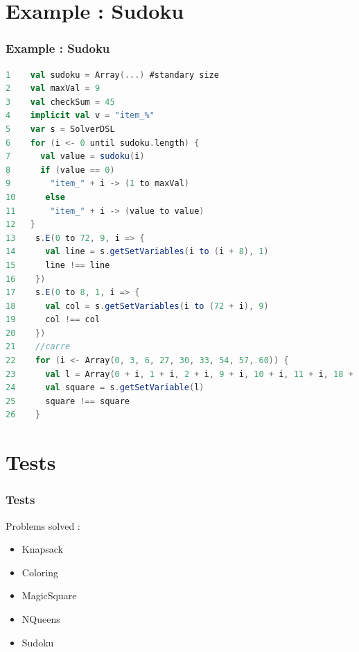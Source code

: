 \documentclass[usenames,dvipsnames]{beamer}
\begin{document}
\section{Example : Sudoku}
\begin{frame}[fragile]
\frametitle{Example : Sudoku}
\begin{lstlisting}[language=scala]
1    val sudoku = Array(...) #standary size
2    val maxVal = 9
3    val checkSum = 45
4    implicit val v = "item_%"
5    var s = SolverDSL
6    for (i <- 0 until sudoku.length) {
7      val value = sudoku(i)
8      if (value == 0) 
9        "item_" + i -> (1 to maxVal)
10      else 
11       "item_" + i -> (value to value)
12   }
13    s.E(0 to 72, 9, i => {
14      val line = s.getSetVariables(i to (i + 8), 1)
15      line !== line
16    })
17    s.E(0 to 8, 1, i => {
18      val col = s.getSetVariables(i to (72 + i), 9)
19      col !== col
20    })
21    //carre
22    for (i <- Array(0, 3, 6, 27, 30, 33, 54, 57, 60)) {
23      val l = Array(0 + i, 1 + i, 2 + i, 9 + i, 10 + i, 11 + i, 18 + i, 19 + i, 20 + i)
24      val square = s.getSetVariable(l)
25      square !== square
26    }

\end{lstlisting}
\end{frame}


\section{Tests}
\begin{frame}
\frametitle{Tests}
Problems solved : 
\begin{itemize}
\item Knapsack
\item Coloring
\item MagicSquare
\item NQueens
\item Sudoku
\end{itemize}
\end{frame}
\end{document}
